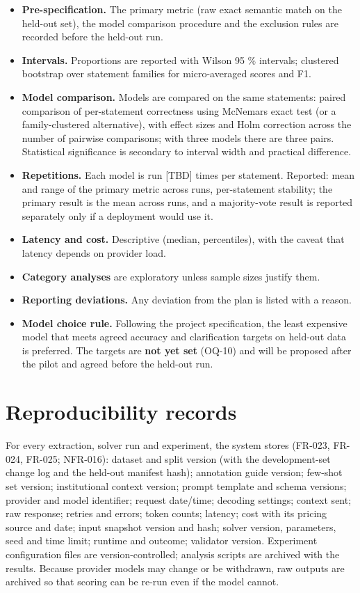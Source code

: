 \documentclass[
  11pt,a4paper,oneside]{report}
\providecommand{\tightlist}{%
  \setlength{\itemsep}{0pt}\setlength{\parskip}{0pt}}
\begin{document}
\begin{itemize}
\tightlist
\item
  \textbf{Pre-specification.} The primary metric (raw exact semantic
  match on the held-out set), the model comparison procedure and the
  exclusion rules are recorded before the held-out run.
\item
  \textbf{Intervals.} Proportions are reported with Wilson 95 \%
  intervals; clustered bootstrap over statement families for
  micro-averaged scores and F1.
\item
  \textbf{Model comparison.} Models are compared on the same statements:
  paired comparison of per-statement correctness using
  McNemar\textquotesingle s exact test (or a family-clustered
  alternative), with effect sizes and Holm correction across the number
  of pairwise comparisons; with three models there are three pairs.
  Statistical significance is secondary to interval width and practical
  difference.
\item
  \textbf{Repetitions.} Each model is run {[}TBD{]} times per statement.
  Reported: mean and range of the primary metric across runs,
  per-statement stability; the primary result is the mean across runs,
  and a majority-vote result is reported separately only if a deployment
  would use it.
\item
  \textbf{Latency and cost.} Descriptive (median, percentiles), with the
  caveat that latency depends on provider load.
\item
  \textbf{Category analyses} are exploratory unless sample sizes justify
  them.
\item
  \textbf{Reporting deviations.} Any deviation from the plan is listed
  with a reason.
\item
  \textbf{Model choice rule.} Following the project specification, the
  least expensive model that meets agreed accuracy and clarification
  targets on held-out data is preferred. The targets are \textbf{not yet
  set} (OQ-10) and will be proposed after the pilot and agreed before
  the held-out run.
\end{itemize}

\hypertarget{reproducibility-records}{%
\section{Reproducibility records}\label{reproducibility-records}}

For every extraction, solver run and experiment, the system stores
(FR-023, FR-024, FR-025; NFR-016): dataset and split version (with the
development-set change log and the held-out manifest hash); annotation
guide version; few-shot set version; institutional context version; prompt template and schema
versions; provider and model identifier; request date/time; decoding
settings; context sent; raw response; retries and errors; token counts;
latency; cost with its pricing source and date; input snapshot version
and hash; solver version, parameters, seed and time limit; runtime and
outcome; validator version. Experiment configuration files are
version-controlled; analysis scripts are archived with the results.
Because provider models may change or be withdrawn, raw outputs are
archived so that scoring can be re-run even if the model cannot.
\end{document}
